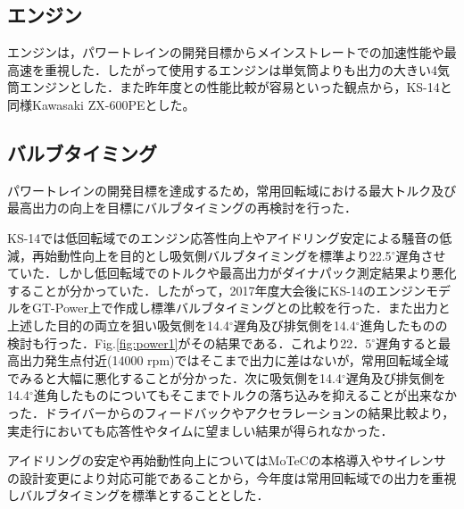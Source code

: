 \subsection{エンジン}
エンジンは，パワートレインの開発目標からメインストレートでの加速性能や最高速を重視した．したがって使用するエンジンは単気筒よりも出力の大きい4気筒エンジンとした．また昨年度との性能比較が容易といった観点から，KS-14と同様Kawasaki ZX-600PEとした。

\subsection{バルブタイミング}
パワートレインの開発目標を達成するため，常用回転域における最大トルク及び最高出力の向上を目標にバルブタイミングの再検討を行った．

KS-14では低回転域でのエンジン応答性向上やアイドリング安定による騒音の低減，再始動性向上を目的とし吸気側バルブタイミングを標準より22.5$^\circ$遅角させていた．しかし低回転域でのトルクや最高出力がダイナパック測定結果より悪化することが分かっていた．したがって，2017年度大会後にKS-14のエンジンモデルをGT-Power上で作成し標準バルブタイミングとの比較を行った．また出力と上述した目的の両立を狙い吸気側を14.4$^\circ$遅角及び排気側を14.4$^\circ$進角したものの検討も行った．Fig.\ref{fig:power1}がその結果である．これより22．5$^\circ$遅角すると最高出力発生点付近(14000 rpm)ではそこまで出力に差はないが，常用回転域全域でみると大幅に悪化することが分かった．次に吸気側を14.4$^\circ$遅角及び排気側を14.4$^\circ$進角したものについてもそこまでトルクの落ち込みを抑えることが出来なかった．ドライバーからのフィードバックやアクセラレーションの結果比較より，実走行においても応答性やタイムに望ましい結果が得られなかった．

アイドリングの安定や再始動性向上についてはMoTeCの本格導入やサイレンサの設計変更により対応可能であることから，今年度は常用回転域での出力を重視しバルブタイミングを標準とすることとした．
